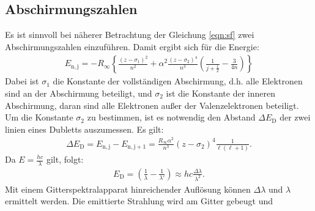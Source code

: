 \subsection{Abschirmungszahlen}
Es ist sinnvoll bei näherer Betrachtung der Gleichung \eqref{eqn:sf} zwei Abschirmungszahlen einzuführen.
Damit ergibt sich für die Energie:
\begin{align}
  E_\mathrm{n,j}=-R_\mathrm{\infty}\left\{\frac{(z-\sigma_\mathrm{1})^2}{n^2}+\alpha^2\frac{(z-\sigma_\mathrm{2})^4}{n^3}\left(\frac{1}{j+\frac{1}{2}}-\frac{3}{4n}\right)\right\}
\end{align}
Dabei ist $\sigma_\mathrm{1}$ die Konstante der vollständigen Abschirmung, d.h. alle Elektronen sind an der Abschirmung beteiligt,
und $\sigma_\mathrm{2}$ ist die Konstante der inneren Abschirmung, daran sind alle Elektronen außer der Valenzelektronen beteiligt.
Um die Konstante $\sigma_\mathrm{2}$ zu bestimmen, ist es notwendig den Abstand $\Delta E_\mathrm{D}$ der zwei linien eines Dubletts auszumessen.
Es gilt:
\begin{align}
  \Delta E_\mathrm{D} = E_\mathrm{n,j}-E_\mathrm{n,j+1}=\frac{R_\mathrm{\infty}\alpha^2}{n^3}(z-\sigma_\mathrm{2})^4\frac{1}{\ell(\ell+1)}.
\end{align}
Da $E=\frac{hc}{\lambda}$ gilt, folgt:
\begin{align}
E_\mathrm{D}=\left(\frac{1}{\lambda}-\frac{1}{\lambda'}\right) \approx hc\frac{\Delta\lambda}{\lambda^2}.
\end{align}
Mit einem Gitterspektralapparat hinreichender Auflösung können $\Delta\lambda$ und $\lambda$ ermittelt werden.
Die emittierte Strahlung wird am Gitter gebeugt und 
